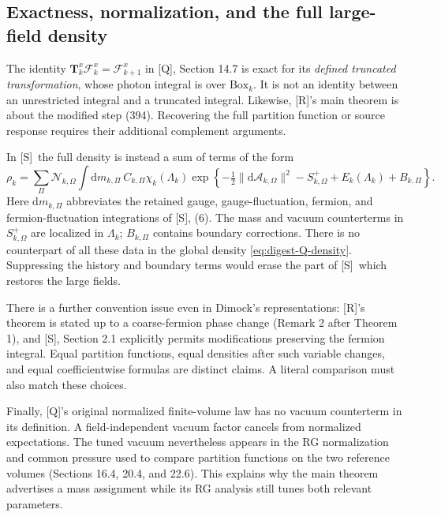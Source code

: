 \documentclass[11pt]{article}
\numberwithin{equation}{section}
\newcommand{\dd}{\mathrm d}
\newcommand{\Q}{\textup{[Q]}}
\newcommand{\UR}{\textup{[R]}}
\newcommand{\US}{\textup{[S]}}
\begin{document}
\subsection{Exactness, normalization, and the full large-field density}

The identity
$\mathbf T_k^x\mathscr F_k^x=\mathscr F_{k+1}^x$ in \Q, Section 14.7
is exact for its \emph{defined truncated transformation}, whose
photon integral is over $\mathrm{Box}_k$. It is not an identity between
an unrestricted integral and a truncated integral. Likewise, \UR's
main theorem is about the modified step (394). Recovering the full
partition function or source response requires their additional
complement arguments.

In \US\ the full density is instead a sum of terms of the form
\begin{equation}
 \rho_k
 =\sum_\Pi\mathcal N_{k,\Omega}\int\dd m_{k,\Pi}\,
 C_{k,\Pi}\chi_k(\Lambda_k)
 \exp\left\{-\tfrac12\|\dd\mathcal A_{k,\Omega}\|^2
             -S^+_{k,\Omega}+E_k(\Lambda_k)+B_{k,\Pi}\right\}.
 \label{eq:digest-history-density}
\end{equation}
Here $\dd m_{k,\Pi}$ abbreviates the retained gauge, gauge-fluctuation,
fermion, and fermion-fluctuation integrations of \US, (6).
The mass and vacuum counterterms in $S^+_{k,\Omega}$ are localized
in $\Lambda_k$; $B_{k,\Pi}$ contains boundary corrections.
There is no counterpart of all these data in the global density
\eqref{eq:digest-Q-density}. Suppressing the history and boundary
terms would erase the part of \US\ which restores the large fields.

There is a further convention issue even in Dimock's representations:
\UR's theorem is stated up to a coarse-fermion phase change
(Remark 2 after Theorem 1), and \US, Section 2.1 explicitly permits
modifications preserving the fermion integral. Equal partition
functions, equal densities after such variable changes, and equal
coefficientwise formulas are distinct claims. A literal comparison
must also match these choices.

Finally, \Q's original normalized finite-volume law has no vacuum
counterterm in its definition. A field-independent vacuum factor
cancels from normalized expectations. The tuned vacuum nevertheless
appears in the RG normalization and common pressure used to compare
partition functions on the two reference volumes (Sections 16.4,
20.4, and 22.6). This explains why the main theorem advertises a mass
assignment while its RG analysis still tunes both relevant parameters.
\end{document}
